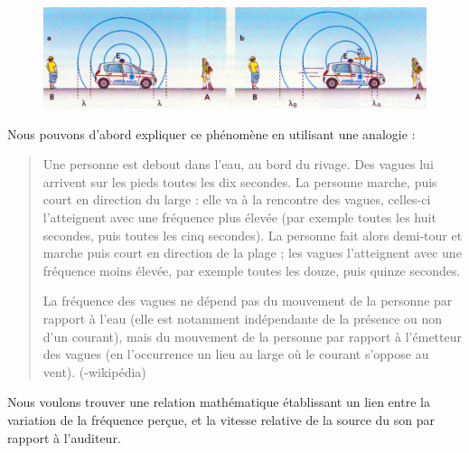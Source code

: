 \documentclass[11pt,a4paper]{article}
\begin{document}
\begin{figure}[H]
    \centering
    \includegraphics[width=\linewidth]{imgs/p5/doppler.jpg}
\end{figure}

Nous pouvons d’abord expliquer ce phénomène en utilisant une analogie : 

\begin{quote}
   Une personne est debout dans l’eau, au bord du rivage. Des vagues lui arrivent sur les pieds toutes les dix secondes. La personne marche, puis court en direction du large : elle va à la rencontre des vagues, celles-ci l’atteignent avec une fréquence plus élevée (par exemple toutes les huit secondes, puis toutes les cinq secondes). La personne fait alors demi-tour et marche puis court en direction de la plage ; les vagues l’atteignent avec une fréquence moins élevée, par exemple toutes les douze, puis quinze secondes.
   
   La fréquence des vagues ne dépend pas du mouvement de la personne par rapport à l’eau (elle est notamment indépendante de la présence ou non d’un courant), mais du mouvement de la personne par rapport à l’émetteur des vagues (en l’occurrence un lieu au large où le courant s’oppose au vent).    (-wikipédia)
\end{quote}

Nous voulons trouver une relation mathématique établissant un lien entre la variation de la fréquence perçue, et la vitesse relative de la source du son par rapport à l'auditeur. 
\end{document}
